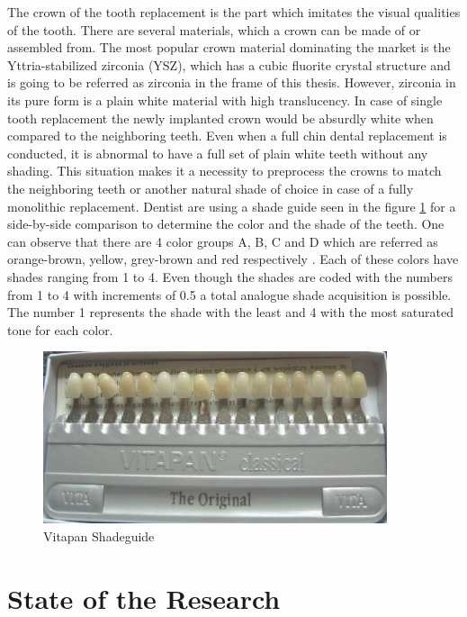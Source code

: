  The crown of the tooth replacement is the part which imitates the visual qualities of the tooth. There are several materials, which a crown can be made of or assembled from. The most popular crown material dominating the market is the Yttria-stabilized zirconia (YSZ), which has a cubic fluorite crystal structure and is going to be referred as zirconia in the frame of this thesis. However, zirconia in its pure form is a plain white material with high translucency. In case of single tooth replacement the newly implanted crown would be absurdly white when compared to the neighboring teeth. Even when a full chin dental replacement is conducted, it is abnormal to have a full set of plain white teeth without any shading. This situation makes it a necessity to preprocess the crowns to match the neighboring teeth or another natural shade of choice in case of a fully monolithic replacement. Dentist are using a shade guide seen in the figure \ref{fig:shadeguide} for a side-by-side comparison to determine the color and the shade of the teeth. One can observe that there are 4 color groups A, B, C and D which are referred as orange-brown, yellow, grey-brown and red respectively \citep{vita}. Each of these colors have shades ranging from 1 to 4. Even though the shades are coded with the numbers from 1 to 4 with increments of 0.5 a total analogue shade acquisition is possible. The number 1 represents the shade with the least and 4 with the most saturated tone for each color.
 \newline
 \begin{figure}[h]
 	\centering
 	\includegraphics[width=0.9\textwidth]{grafiken/shadeguide.jpg}
 	\caption{Vitapan Shadeguide}
 	\label{fig:shadeguide}
 \end{figure}  
 


\chapter{State of the Research}
\label{sec:stand_forschung}

